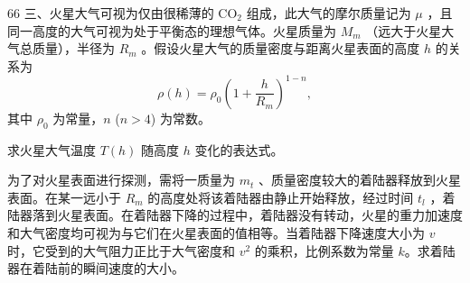 \begin{problem}[33届物理竞赛决赛]{66}
    三、火星大气可视为仅由很稀薄的 $\mathrm{CO}_{2}$ 组成，此大气的摩尔质量记为 $\mu$ ，且同一高度的大气可视为处于平衡态的理想气体。火星质量为 $M_{m}$ （远大于火星大气总质量），半径为 $R_{m}$ 。假设火星大气的质量密度与距离火星表面的高度 $h$ 的关系为
    \begin{equation*}
        \rho(h) = \rho_{0} \left( 1 + \frac{h}{R_{m}} \right)^{1-n},
    \end{equation*}
    其中 $\rho_{0}$ 为常量，$n$ ($n>4$) 为常数。
    \begin{subproblem}
        求火星大气温度 $T(h)$ 随高度 $h$ 变化的表达式。
    \end{subproblem}
    \begin{subproblem}
        为了对火星表面进行探测，需将一质量为 $m_{t}$ 、质量密度较大的着陆器释放到火星表面。在某一远小于 $R_{m}$ 的高度处将该着陆器由静止开始释放，经过时间 $t_{l}$ ，着陆器落到火星表面。在着陆器下降的过程中，着陆器没有转动，火星的重力加速度和大气密度均可视为与它们在火星表面的值相等。当着陆器下降速度大小为 $v$ 时，它受到的大气阻力正比于大气密度和 $v^{2}$ 的乘积，比例系数为常量 $k$。求着陆器在着陆前的瞬间速度的大小。
    \end{subproblem}
\end{problem}